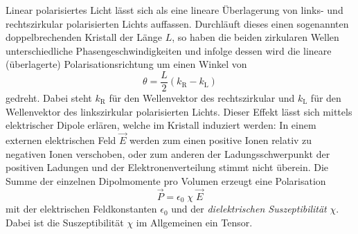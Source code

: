 Linear polarisiertes Licht lässt sich als eine lineare Überlagerung von
links- und rechtszirkular polarisierten Lichts auffassen.
Durchläuft dieses einen sogenannten doppelbrechenden Kristall der Länge $L$,
so haben die beiden zirkularen Wellen unterschiedliche Phasengeschwindigkeiten
und infolge dessen wird die lineare (überlagerte) Polarisationsrichtung
um einen Winkel von
\begin{equation}
  \theta = \frac{L}{2} \left(k_\text{R} - k_\text{L}\right)
  \label{eqn:Winkel-2}
\end{equation}
gedreht.
Dabei steht $k_\text{R}$ für den Wellenvektor des rechtszirkular und
$k_\text{L}$ für den Wellenvektor des linkszirkular polarisierten Lichts.
Dieser Effekt lässt sich mittels elektrischer Dipole erlären,
welche im Kristall induziert werden:
In einem externen elektrischen Feld $\vec{E}$ werden zum einen positive Ionen relativ
zu negativen Ionen verschoben, oder zum anderen der Ladungsschwerpunkt der
positiven Ladungen und der Elektronenverteilung stimmt nicht überein.
Die Summe der einzelnen Dipolmomente pro Volumen erzeugt eine Polarisation
\begin{equation}
  \vec{P} = \epsilon_0 \; \chi \; \vec{E}
  \label{eqn:Polarisation}
\end{equation}
mit der elektrischen Feldkonstanten $\epsilon_0$ und der
\emph{dielektrischen Suszeptibilität} $\chi$.
Dabei ist die Suszeptibilität $\chi$ im Allgemeinen ein Tensor.

